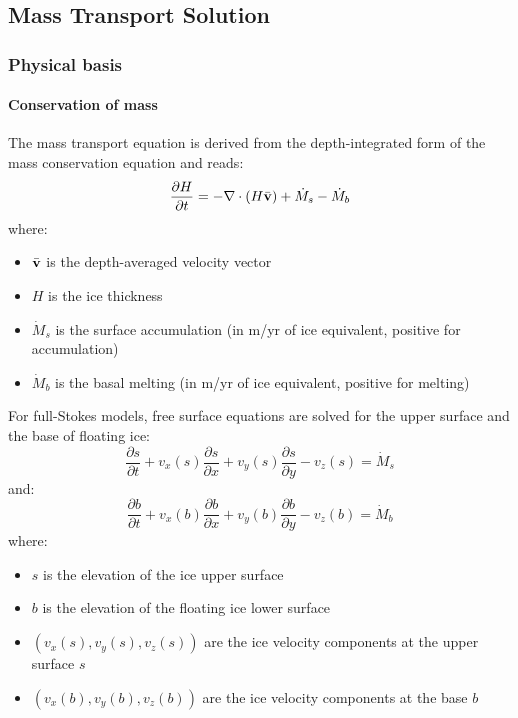 
\subsection{Mass Transport Solution} \label{sec:using-issm-capabilities-mass-transport}

\subsubsection{Physical basis}
\paragraph{Conservation of mass}
The mass transport equation is derived from the depth-integrated form of the mass conservation equation and reads:
\begin{equation}
	\frac{\partial H}{\partial t} = - \nabla \cdot \left(H \bar{\bf v}\right) + \dot{M}_s - \dot{M}_b
\end{equation}
where:
\begin{itemize}
	\item $\bar{\bf v}$ is the depth-averaged velocity vector
	\item $H$ is the ice thickness
	\item $\dot{M}_s$ is the surface accumulation (in m/yr of ice equivalent, positive for accumulation)
	\item $\dot{M}_b$ is the basal melting (in m/yr of ice equivalent, positive for melting)
\end{itemize}

For full-Stokes models, free surface equations are solved for the upper surface and the base of floating ice:
\begin{equation}
	\frac{\partial s}{\partial t}
	+ v_x\left(s\right) \dfrac{\partial s}{\partial x}
	+ v_y\left(s\right) \dfrac{\partial s}{\partial y}
	- v_z\left(s\right)
	= \dot{M}_s
\end{equation}
and:
\begin{equation}
	\frac{\partial b}{\partial t}
	+ v_x\left(b\right) \dfrac{\partial b}{\partial x}
	+ v_y\left(b\right) \dfrac{\partial b}{\partial y}
	- v_z\left(b\right)
	= \dot{M}_b
\end{equation}
where:
\begin{itemize}
	\item $s$ is the elevation of the ice upper surface
	\item $b$ is the elevation of the floating ice lower surface
	\item $\left(v_x\left(s\right),v_y\left(s\right),v_z\left(s\right)\right)$ are the ice velocity
		components at the upper surface $s$
	\item $\left(v_x\left(b\right),v_y\left(b\right),v_z\left(b\right)\right)$ are the ice velocity
		components at the base $b$
\end{itemize}

